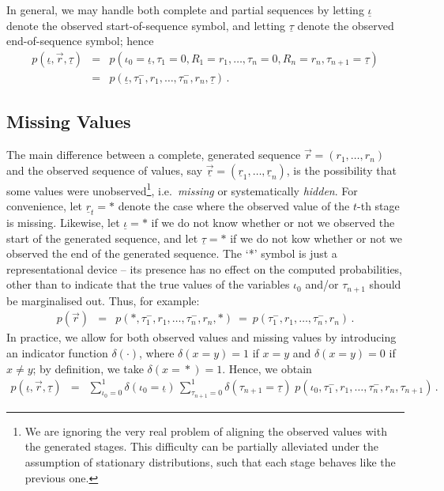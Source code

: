 \documentclass[a4paper]{article}
\newcommand{\ui}{\underline{\iota}}
\newcommand{\ut}{\underline{\tau}}
\newcommand{\ur}{\underline{r}}
\newcommand{\vr}{\vec{r}}
\newcommand{\uvr}{\underline{\vr}}
\newcommand{\tm}{\tau^{-}}
\begin{document}
In general, we may handle both complete and partial sequences by letting $\ui$ denote the observed start-of-sequence symbol, and
letting $\ut$ denote the observed end-of-sequence symbol; hence
\begin{eqnarray}
p(\ui,\vr,\ut)
& = & p(\iota_0\!=\!\ui,\tau_1\!=\!0,R_1\!=\!r_1,\ldots,\tau_n\!=\!0,R_n\!=\!r_n,\tau_{n+1}\!=\!\ut)
\nonumber\\
& = & p(\ui,\tm_1,r_1,\ldots,\tm_n,r_n,\ut)\,.
\label{eq:pr:gen}
\end{eqnarray}

\subsection{Missing Values}

The main difference between a complete, generated sequence $\vr=(r_1,\ldots,r_n)$
and the observed sequence of values, say $\uvr=(\ur_1,\ldots,\ur_n)$, 
is the possibility that some values were unobserved\footnote{We are ignoring the very real problem
of aligning the observed values with the generated stages. This difficulty can be partially alleviated under the assumption of stationary distributions, such that each stage behaves
like the previous one.}, i.e.\ {\em missing} or systematically {\em hidden}.
For convenience, let $\ur_t=*$ denote the case where the  observed value of the $t$-th stage is missing.
Likewise, let $\ui=*$ if we do not know whether or not we observed the start of the generated sequence,
and let $\ut=*$ if we do not kow whether or not we observed the end of the generated sequence.
The `*' symbol is just a representational device -- its presence has no effect on the computed probabilities, other than to indicate that the true values
of the variables $\iota_0$ and/or $\tau_{n+1}$ should be marginalised out. Thus, for example:
\begin{eqnarray}
p(\vr) 
& = & p(*,\tm_1,r_1,\ldots,\tm_n,r_n,*)~=~p(\tm_1,r_1,\ldots,\tm_n,r_n)\,.
\end{eqnarray}
In practice, we allow for both observed values and missing values by introducing an indicator function $\delta(\cdot)$,
where $\delta(x\!=\!y)=1$ if $x=y$ and $\delta(x\!=\!y)=0$ if $x\ne y$;  by definition, we take $\delta(x\!=\!*)=1$.
Hence, we obtain
\begin{eqnarray}
p(\ui,\vr,\ut) 
& = & 
\sum_{\iota_0=0}^{1}\delta(\iota_0\!=\!\ui)
\,\sum_{\tau_{n+1}=0}^{1}\delta(\tau_{n+1}\!=\!\ut)\;
p(\iota_0,\tm_1,r_1,\ldots,\tm_n,r_n,\tau_{n+1})\,.
\end{eqnarray}
\end{document}

